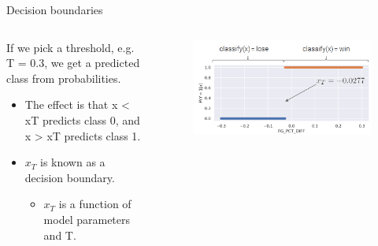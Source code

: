 \documentclass[aspectratio=169]{../latex_main/tntbeamer}  %
\begin{document}
	\begin{frame}{Decision boundaries }
	    \begin{columns}
	        \begin{column}{.5\textwidth}
	            If we pick a threshold, e.g. T = 0.3, we get a predicted class from probabilities.
	            \begin{itemize}
	                \item The effect is that x < xT predicts class 0, and x > xT predicts class 1.
	                \item $x_T$ is known as a decision boundary.
	                \begin{itemize}
	                    \item $x_T$ is a function of model parameters and T.

	                \end{itemize}
	            \end{itemize}
	        \end{column}
	        
	        
	        \begin{column}{.5\textwidth}
	                \begin{figure}
	                    \centering
	                    \includegraphics[scale=.35]{Bild35}\\
	                \end{figure}
	        \end{column}
	        
	    \end{columns}
	\end{frame}
	
\end{document}
